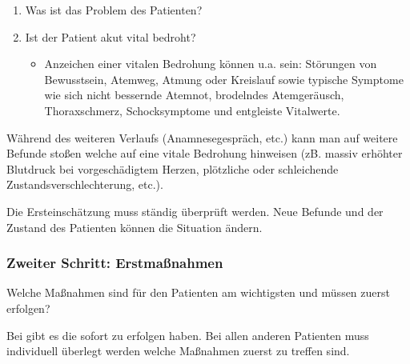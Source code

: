 \begin{enumerate}
    \item Was ist das Problem des Patienten?
    \item Ist der Patient akut vital bedroht?
    \begin{itemize}
        \item Anzeichen einer vitalen Bedrohung können u.a. sein: Störungen
        von Be\-wusstsein, Atemweg, Atmung oder Kreislauf sowie typische
        Symptome wie sich nicht bessernde Atemnot, brodelndes
        Atem\-ge\-r\"ausch, Thoraxschmerz, Schocksymptome und entgleiste
        Vital\-werte.
    \end{itemize}
\end{enumerate}



W\"ahrend des weiteren Verlaufs (Anamnesegespr\"ach, etc.) kann man auf
weitere Befunde stoßen welche auf eine vitale Be\-drohung hinweisen
(zB. massiv erhöhter Blutdruck bei vor\-ge\-sch\"adigtem Herzen,
plötzliche oder schleichende Zustands\-verschlechterung, etc.). 

Die Ersteinsch\"atzung muss st\"andig überprüft werden. Neue Befunde
und der Zustand des Patienten können die Situation \"andern.

\subsubsection{Zweiter Schritt: Erstmaßnahmen}

Welche Maßnahmen sind für den Patienten am wichtigsten und
müssen zuerst erfolgen? 



Bei  gibt es  die sofort zu erfolgen haben. Bei
allen anderen Patienten muss individuell überlegt werden welche Maßnahmen zuerst zu treffen sind.

